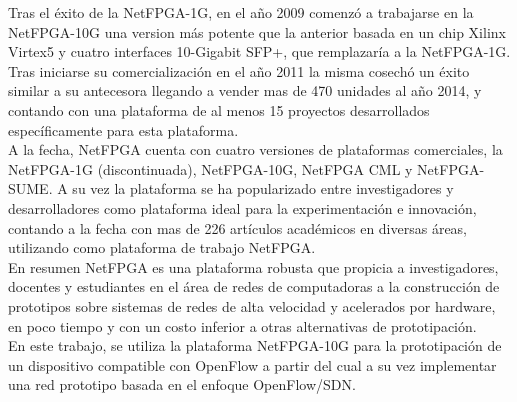 Tras el éxito de la NetFPGA-1G, en el año 2009 comenzó a trabajarse en la NetFPGA-10G una version m\'as potente que la  anterior basada en un chip Xilinx Virtex5 y cuatro interfaces 10-Gigabit SFP+, que remplazaría a la NetFPGA-1G. Tras iniciarse su comercialización en el año 2011 la misma cosech\'o un éxito similar a su antecesora llegando a vender mas de 470 unidades al año 2014, y contando con una plataforma de al menos 15 proyectos desarrollados específicamente para esta plataforma.\\

A la fecha, NetFPGA cuenta con cuatro versiones de plataformas comerciales, la NetFPGA-1G  
 (discontinuada), NetFPGA-10G, NetFPGA CML y NetFPGA-SUME. A su vez la plataforma se ha popularizado entre investigadores y desarrolladores como plataforma ideal para la experimentación e innovación, contando a la fecha con mas de 226 artículos académicos\cite{NetFPGA4} en diversas áreas, utilizando como plataforma de trabajo NetFPGA.\\

En resumen NetFPGA es una plataforma robusta que propicia a investigadores, docentes y estudiantes en el área de redes de computadoras a la construcción de prototipos sobre sistemas de redes de alta velocidad y acelerados por hardware, en poco tiempo y con un costo inferior a otras alternativas de prototipaci\'on.\\

En este trabajo, se utiliza la plataforma NetFPGA-10G para la prototipaci\'on de un dispositivo compatible con OpenFlow a partir del cual a su vez implementar una red prototipo basada en el enfoque OpenFlow/SDN. 

